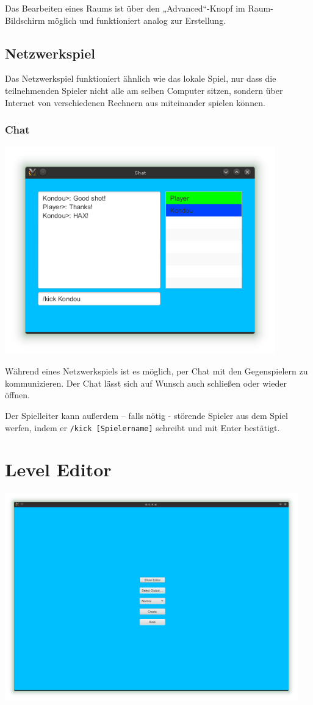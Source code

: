 \documentclass{scrreprt}
\begin{document}
Das Bearbeiten eines Raums ist über den „Advanced“-Knopf im Raum-Bildschirm möglich und funktioniert analog zur Erstellung.


\section{Netzwerkspiel}

Das Netzwerkspiel funktioniert ähnlich wie das lokale Spiel, nur dass die teilnehmenden Spieler nicht alle am selben Computer sitzen, sondern über Internet von verschiedenen Rechnern aus miteinander spielen können.

\subsection{Chat}

\includegraphics[height=9cm]{Screenshot12.png}

Während eines Netzwerkspiels ist es möglich, per Chat mit den Gegenspielern zu kommunizieren. Der Chat lässt sich auf Wunsch auch schließen oder wieder öffnen.

Der Spielleiter kann außerdem – falls nötig - störende Spieler aus dem Spiel werfen, indem er \texttt{/kick [Spielername]} schreibt und mit Enter
bestätigt.

\chapter{Level Editor}
\label{Level Editor} 

\includegraphics[height=9cm]{Screenshot3.png}
\end{document}

